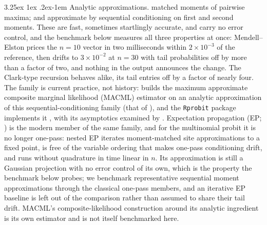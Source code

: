 \documentclass[11pt]{article}
\makeatletter
\renewcommand\paragraph{\@startsection{paragraph}{4}{\z@}%
  {3.25ex \@plus1ex \@minus.2ex}{-1em}%
  {\normalfont\normalsize\itshape}}
\makeatother
\begin{document}
\paragraph{Analytic approximations.} \citet{clark1961} matched moments of
pairwise maxima; \citet{mendell1974} and \citet{solow1990} approximate by
sequential conditioning on first and second moments. These are fast, sometimes
startlingly accurate, and carry no error control, and the benchmark below
measures all three properties at once: Mendell--Elston prices the $n=10$ vector
in two milliseconds within $2\times10^{-3}$ of the reference, then drifts to
$3\times10^{-2}$ at $n=30$ with tail probabilities off by more than a factor
of two, and nothing in the output announces the change. The Clark-type recursion
behaves alike, its tail entries off by a factor of nearly four. The family is current practice, not history:
\citet{bhat2011} builds the maximum approximate composite marginal likelihood (MACML) estimator on an analytic approximation
of this sequential-conditioning family (that of \citealp{solow1990}), and the \texttt{Rprobit} package implements it
\citep{bauerRprobit}, with its asymptotics examined by
\citet{batram2019}. Expectation propagation (EP; \citealp{minka2001})
is the modern member of the same family, and for the multinomial probit
it is no longer one-pass: nested EP \citep{riihimaki2013} iterates
moment-matched site approximations to a fixed point, is free of the
variable ordering that makes one-pass conditioning drift, and runs
without quadrature in time linear in $n$. Its approximation is still a
Gaussian projection with no error control of its own, which is the
property the benchmark below probes; we benchmark representative
sequential moment approximations through the classical one-pass
members, and an iterative EP baseline is left out of the comparison
rather than assumed to share their tail drift. MACML's
composite-likelihood construction around its analytic ingredient is its own
estimator and is not itself benchmarked here.
\end{document}
